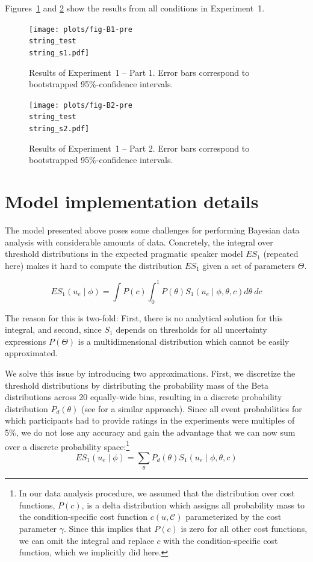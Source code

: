 Figures~\ref{fig:norming-results-1} and \ref{fig:norming-results-2} show the results from all conditions in Experiment~1. 

\begin{figure}[h!]
\texttt{[image: plots/fig-B1-pre\\string\_test\\string\_s1.pdf]}
\caption{Results of Experiment~1 -- Part 1. Error bars correspond to bootstrapped 95\%-confidence intervals. \label{fig:norming-results-1}}
\end{figure}

\begin{figure}[h!]
\texttt{[image: plots/fig-B2-pre\\string\_test\\string\_s2.pdf]}
\caption{Results of Experiment~1  -- Part 2. Error bars correspond to bootstrapped 95\%-confidence intervals. \label{fig:norming-results-2}}
\vspace{4cm}

\end{figure}


\chapter{Model implementation details}

The model presented above poses some challenges for performing Bayesian data analysis with considerable amounts of data. 
Concretely, the integral over threshold distributions in the expected pragmatic speaker model $ES_1$ (repeated here) makes it hard to compute 
the distribution $ES_1$ given a set of parameters $\Theta$.

$$ES_1\left(u_e \mid \phi \right) = \int P(c) \int_0^1 P(\theta) S_1\left(u _e\mid \phi, \theta, c\right) d\theta \  d c$$

The reason for this is two-fold: First, there is no analytical solution for this integral, and second, since $S_1$ depends on
thresholds for all uncertainty expressions $P(\Theta)$ is a multidimensional distribution which cannot be easily approximated.

We solve this issue by introducing two approximations. First, we discretize the threshold distributions by distributing the probability mass
of the Beta distributions across 20 equally-wide bins, resulting in a discrete probability distribution $P_{d}(\theta)$ (see \cite{Tessler2019} for a similar approach). Since all event probabilities for which participants had to provide ratings in the
experiments were multiples of 5\%, we do not lose any accuracy and gain the advantage that we can now sum over a discrete probability space:\footnote{In our data analysis procedure, we assumed that the 
distribution over cost functions, $P(c)$, is a delta distribution which assigns all probability mass to the condition-specific cost function 
$c(u, \mathscr{C})$ parameterized by the cost parameter $\gamma$. Since this implies that $P(c)$ is zero for all other cost functions, we can omit the integral and replace $c$ 
with the condition-specific cost function, which we implicitly did here.}
$$ES_1\left(u_e \mid \phi \right) = \sum_{\theta} P_{d}(\theta) S_1\left(u _e\mid \phi, \theta, c\right)$$

